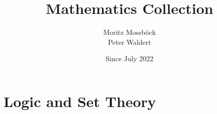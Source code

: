 \documentclass{report}
\author{Moritz Mossböck \\ Peter Waldert}
\title{Mathematics Collection}
\date{Since July 2022}
\begin{document}
    \pagestyle{empty}
    \begin{titlepage}
        \maketitle
    \end{titlepage}

    

    \pagestyle{fancy}
    \tableofcontents

    \newpage
    
    \chapter{Logic and Set Theory}\label{chp:logic_set}
    
    
\end{document}
